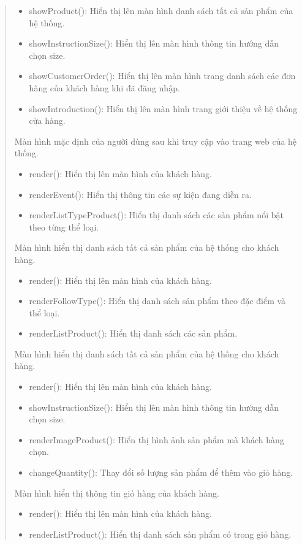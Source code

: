 \begin{quote}
\begin{itemize}
		\item showProduct(): Hiển thị lên màn hình danh sách tất cả sản phẩm của hệ thống.
		\item showInstructionSize(): Hiển thị lên màn hình thông tin hướng dẫn chọn size.
		\item showCustomerOrder(): Hiển thị lên màn hình trang danh sách các đơn hàng của khách hàng khi đã đăng nhập.
		\item showIntroduction(): Hiển thị lên màn hình trang giới thiệu về hệ thống cửa hàng.
	\end{itemize}
	Màn hình mặc định của người dùng sau khi truy cập vào trang web của hệ thống.
	\begin{itemize}
		\item render(): Hiển thị lên màn hình của khách hàng.
		\item renderEvent(): Hiển thị thông tin các sự kiện đang diễn ra.
		\item renderListTypeProduct(): Hiển thị danh sách các sản phẩm nổi bật theo từng thể loại.
	\end{itemize}
	Màn hình hiển thị danh sách tất cả sản phẩm của hệ thống cho khách hàng.
	\begin{itemize}
		\item render(): Hiển thị lên màn hình của khách hàng.
		\item renderFollowType(): Hiển thị danh sách sản phẩm theo đặc điểm và thể loại.
		\item renderListProduct(): Hiển thị danh sách các sản phẩm.
	\end{itemize}
	 Màn hình hiển thị danh sách tất cả sản phẩm của hệ thống cho khách hàng.
	\begin{itemize}
		\item render(): Hiển thị lên màn hình của khách hàng.
		\item showInstructionSize(): Hiển thị lên màn hình thông tin hướng dẫn chọn size.
		\item renderImageProduct(): Hiển thị hình ảnh sản phẩm mà khách hàng chọn.
		\item changeQuantity(): Thay đổi số lượng sản phẩm để thêm vào giỏ hàng.
	\end{itemize}
	Màn hình hiển thị thông tin giỏ hàng của khách hàng.
	\begin{itemize}
		\item render(): Hiển thị lên màn hình của khách hàng.
		\item renderListProduct(): Hiển thị danh sách sản phẩm có trong giỏ hàng.

\end{itemize}
\end{quote}
